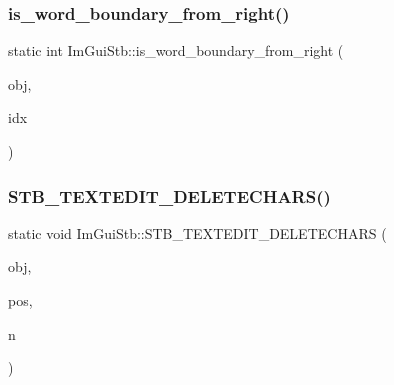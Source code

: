 \hypertarget{namespace_im_gui_stb_a4e3d14415639a57b7d77dfedfa91b8f7}{}\label{namespace_im_gui_stb_a4e3d14415639a57b7d77dfedfa91b8f7} 
\subsubsection{\texorpdfstring{is\+\_\+word\+\_\+boundary\+\_\+from\+\_\+right()}{is\_word\_boundary\_from\_right()}}
{\footnotesize\ttfamily static int Im\+Gui\+Stb\+::is\+\_\+word\+\_\+boundary\+\_\+from\+\_\+right (\begin{DoxyParamCaption}\item[{S\+T\+B\+\_\+\+T\+E\+X\+T\+E\+D\+I\+T\+\_\+\+S\+T\+R\+I\+NG $\ast$}]{obj,  }\item[{int}]{idx }\end{DoxyParamCaption})\hspace{0.3cm}{\ttfamily [static]}}

\hypertarget{namespace_im_gui_stb_aa8e93b4c0311ac9f020fdd26d2652596}{}\label{namespace_im_gui_stb_aa8e93b4c0311ac9f020fdd26d2652596} 
\subsubsection{\texorpdfstring{S\+T\+B\+\_\+\+T\+E\+X\+T\+E\+D\+I\+T\+\_\+\+D\+E\+L\+E\+T\+E\+C\+H\+A\+R\+S()}{STB\_TEXTEDIT\_DELETECHARS()}}
{\footnotesize\ttfamily static void Im\+Gui\+Stb\+::\+S\+T\+B\+\_\+\+T\+E\+X\+T\+E\+D\+I\+T\+\_\+\+D\+E\+L\+E\+T\+E\+C\+H\+A\+RS (\begin{DoxyParamCaption}\item[{S\+T\+B\+\_\+\+T\+E\+X\+T\+E\+D\+I\+T\+\_\+\+S\+T\+R\+I\+NG $\ast$}]{obj,  }\item[{int}]{pos,  }\item[{int}]{n }\end{DoxyParamCaption})\hspace{0.3cm}{\ttfamily [static]}}

